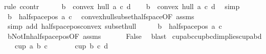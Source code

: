 \begin{isabellebody}
%
\isadelimproof
%
\endisadelimproof
%
\isatagproof
{}\isamarkupfalse%
{\isacharparenleft}{\kern0pt}rule\ ccontr{\isacharparenright}{\kern0pt}\isanewline
\ \ \isamarkupfalse%
\ {\isachardoublequoteopen}\ {\isasymnot}\ b\ {\isasymnotin}\ convex\ hull\ {\isacharbraceleft}{\kern0pt}a{\isacharcomma}{\kern0pt}\ c{\isacharcomma}{\kern0pt}\ d{\isacharbraceright}{\kern0pt}{\isachardoublequoteclose}\isanewline
\ \ \isamarkupfalse%
\ {\isachardoublequoteopen}b\ {\isasymin}\ convex\ hull\ {\isacharbraceleft}{\kern0pt}a{\isacharcomma}{\kern0pt}\ c{\isacharcomma}{\kern0pt}\ d{\isacharbraceright}{\kern0pt}{\isachardoublequoteclose}\ \isamarkupfalse%
\ simp\isanewline
\ \ \isamarkupfalse%
\ {\isachardoublequoteopen}b\ {\isasymin}\ halfspace{\isacharunderscore}{\kern0pt}pos\ a\ c{\isachardoublequoteclose}\ \isamarkupfalse%
\ convex{\isacharunderscore}{\kern0pt}hull{\isacharunderscore}{\kern0pt}subset{\isacharunderscore}{\kern0pt}halfspace{\isacharbrackleft}{\kern0pt}OF\ assms{\isacharbrackright}{\kern0pt}\ \isanewline
\ \ \ \ \isamarkupfalse%
\ {\isacharparenleft}{\kern0pt}simp\ add{\isacharcolon}{\kern0pt}\ halfspace{\isacharunderscore}{\kern0pt}pos{\isacharunderscore}{\kern0pt}convex\ subset{\isacharunderscore}{\kern0pt}hull{\isacharparenright}{\kern0pt}\isanewline
\ \ \isamarkupfalse%
\ \isamarkupfalse%
\ {\isachardoublequoteopen}b\ {\isasymnotin}\ halfspace{\isacharunderscore}{\kern0pt}pos\ a\ c{\isachardoublequoteclose}\ \isamarkupfalse%
\ bNotInhalfspace{\isacharunderscore}{\kern0pt}pos{\isacharbrackleft}{\kern0pt}OF\ assms{\isacharbrackright}{\kern0pt}\ \isakeywordONE{{\isachardot}{\kern0pt}}\isamarkupfalse%
\isanewline
\ \ \isamarkupfalse%
\ \isamarkupfalse%
\ False\ \isamarkupfalse%
\ blast\isanewline
{}\isamarkupfalse%
%
\endisatagproof
{\isafoldproof}%
%
\isadelimproof
\isanewline
%
\endisadelimproof
\isanewline
\isanewline
\isanewline
\isanewline
\isanewline
{}\isamarkupfalse%
\ cup{\isacharunderscore}{\kern0pt}abc{\isacharunderscore}{\kern0pt}cup{\isacharunderscore}{\kern0pt}bcd{\isacharunderscore}{\kern0pt}implies{\isacharunderscore}{\kern0pt}cup{\isacharunderscore}{\kern0pt}abd{\isacharcolon}{\kern0pt}\isanewline
\ \ \ {\isachardoublequoteopen}cup{}\ a\ b\ c{\isachardoublequoteclose}\isanewline
\ \ \ \ \ \ \ {\isachardoublequoteopen}cup{}\ b\ c\ d{\isachardoublequoteclose}\isanewline

\end{isabellebody}
